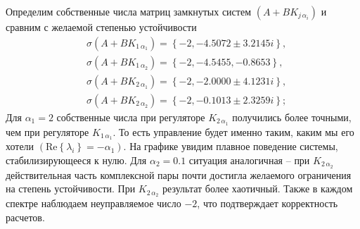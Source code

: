 \documentclass[a4paper, 12pt]{article}
\begin{document}
    Определим собственные числа матриц замкнутых систем $\left( A+BK_{j\,\alpha_i} \right)$
    и сравним с желаемой степенью устойчивости
    \begin{align*}
    &\sigma\left( A+BK_{1\,\alpha_1} \right)=\left\{ -2, -4.5072\pm3.2145i \right\},\\
    &\sigma\left( A+BK_{1\,\alpha_2} \right)=\left\{ -2,-4.5455,-0.8653 \right\},\\
    &\sigma\left( A+BK_{2\,\alpha_1} \right)=\left\{ -2, -2.0000\pm4.1231i \right\},\\
    &\sigma\left( A+BK_{2\,\alpha_2} \right)=\left\{ -2,-0.1013\pm2.3259i \right\};
    \end{align*}
    Для $\alpha_1=2$ собственные числа при регуляторе $K_{2\,\alpha_1}$ получились более точными,
    чем при регуляторе $K_{1\,\alpha_1}$. То есть управление будет именно таким, каким мы его хотели $\left( \text{Re}\left\{ \lambda_i \right\}=-\alpha_1 \right)$.
    На графике увидим плавное поведение системы, стабилизирующееся к нулю. Для $\alpha_2=0.1$ ситуация аналогичная
    -- при $K_{2\,\alpha_2}$ действительная часть комплексной пары почти достигла желаемого ограничения на степень устойчивости.
    При $K_{2\,\alpha_2}$ результат более хаотичный. Также в каждом спектре наблюдаем неуправляемое число $-2$, что подтверждает
    корректность расчетов.
\end{document}

